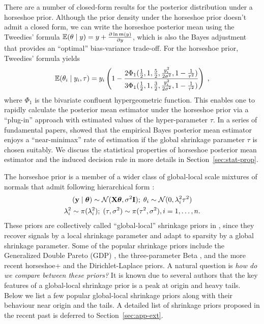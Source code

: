 \documentclass[11pt]{article}
\begin{document}
There are a number of closed-form results for the posterior distribution under a
horseshoe prior. Although the prior density under the horseshoe prior doesn't
admit a closed form, we can write the horseshoe posterior mean using the
Tweedies' formula $\mathbb E(\theta \mid y) = y + \frac{\partial \ln m(y)}{\partial y}$, which is also
the Bayes adjustment that provides an ``optimal'' bias-variance trade-off.
For the horseshoe prior, Tweedies' formula yields
\begin{equation}
  \mathbb E(\theta_i \mid y_i, \tau) = y_i \left( 1 - \frac{2\Phi_1(\frac{1}{2}, 1,
  \frac{5}{2},\frac{y_i^2}{2\sigma^2}, 1-\frac{1}{\tau^2})}{
  3\Phi_1(\frac{1}{2}, 1, \frac{3}{2},\frac{y_i^2}{2\sigma^2}, 1-\frac{1}{\tau^2})} \right)
  \;,
\end{equation}
where $\Phi_1$ is the bivariate confluent hypergeometric function. This
enables one to rapidly calculate the posterior mean estimator under the
horseshoe prior via a ``plug-in'' approach with estimated values of the
hyper-parameter $\tau$. In a series of fundamental papers,
\citet{van2014horseshoe} showed that the empirical Bayes posterior mean
estimator enjoys  a ``near-minimax'' rate of estimation if the global shrinkage
parameter $\tau$ is chosen suitably. We discuss the statistical properties of
horseshoe posterior mean estimator and the induced decision rule in more
details in Section~\ref{sec:stat-prop}. 

%
The horseshoe prior is a member of a wider class of global-local scale mixtures of normals that admit following hierarchical form \citep{polson2010shrink}: 
\begin{gather*}
({\bf y} \mid \boldsymbol{\theta}) \sim {\cal N}({\bf X} \boldsymbol{\theta}, \sigma^2 {\bf I}) ;\; \theta_i \sim {\cal N}(0, \lambda_i^2 \tau^2) \\
\lambda_i^2 \sim \pi(\lambda_i^2) ; \; (\tau,\sigma^2) \sim  \pi(\tau^2,\sigma^2), i = 1, \ldots, n. 
\end{gather*}
These priors are collectively called ``global-local'' shrinkage priors in
\cite{polson2010shrink}, since they recover signals by a local shrinkage
parameter and adapt to sparsity by a global shrinkage parameter. Some of the
popular shrinkage priors include the Generalized Double Pareto (GDP)
\citep{armagan2013generalized}, the three-parameter Beta
\citep{armagan2011generalized}, and the more recent horseshoe+
\citep{bhadra2015horseshoe+} and the Dirichlet-Laplace
\citep{bhattacharya2014dirichlet} priors. A natural question is \textit{how do
we compare between these priors?} It is known due to several authors
\citep[e.g.]{polson2010shrink,bhadra2015default,van2015conditions} that the key
features of a global-local shrinkage prior is a peak at origin and heavy tails.
Below we list a few popular global-local shrinkage priors along with their
behaviour near origin and the tails. A detailed list of shrinkage priors
proposed in the recent past is deferred to Section~\ref{sec:app-ext}.
\end{document}
